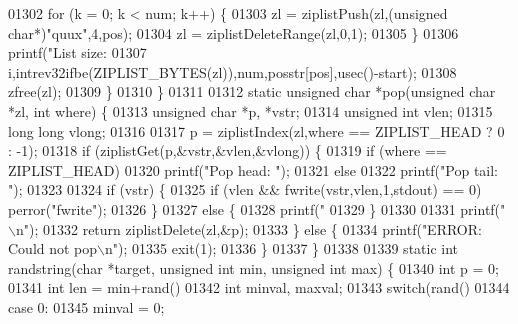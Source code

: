 \begin{DoxyCode}
{{{{{{{{{{{{{{{01302         \textcolor{keywordflow}{for} (k = 0; k < num; k++) \{
01303             zl = ziplistPush(zl,(\textcolor{keywordtype}{unsigned} \textcolor{keywordtype}{char}*)\textcolor{stringliteral}{"quux"},4,pos);
01304             zl = ziplistDeleteRange(zl,0,1);
01305         \}
01306         printf(\textcolor{stringliteral}{"List size: %
01307             i,intrev32ifbe(ZIPLIST\_BYTES(zl)),num,posstr[pos],usec()-start);
01308         zfree(zl);
01309     \}
01310 \}
01311 
01312 \textcolor{keyword}{static} \textcolor{keywordtype}{unsigned} \textcolor{keywordtype}{char} *pop(\textcolor{keywordtype}{unsigned} \textcolor{keywordtype}{char} *zl, \textcolor{keywordtype}{int} where) \{
01313     \textcolor{keywordtype}{unsigned} \textcolor{keywordtype}{char} *p, *vstr;
01314     \textcolor{keywordtype}{unsigned} \textcolor{keywordtype}{int} vlen;
01315     \textcolor{keywordtype}{long} \textcolor{keywordtype}{long} vlong;
01316 
01317     p = ziplistIndex(zl,where == ZIPLIST\_HEAD ? 0 : -1);
01318     \textcolor{keywordflow}{if} (ziplistGet(p,&vstr,&vlen,&vlong)) \{
01319         \textcolor{keywordflow}{if} (where == ZIPLIST\_HEAD)
01320             printf(\textcolor{stringliteral}{"Pop head: "});
01321         \textcolor{keywordflow}{else}
01322             printf(\textcolor{stringliteral}{"Pop tail: "});
01323 
01324         \textcolor{keywordflow}{if} (vstr) \{
01325             \textcolor{keywordflow}{if} (vlen && fwrite(vstr,vlen,1,stdout) == 0) perror(\textcolor{stringliteral}{"fwrite"});
01326         \}
01327         \textcolor{keywordflow}{else} \{
01328             printf(\textcolor{stringliteral}{"%
01329         \}
01330 
01331         printf(\textcolor{stringliteral}{"\(\backslash\)n"});
01332         \textcolor{keywordflow}{return} ziplistDelete(zl,&p);
01333     \} \textcolor{keywordflow}{else} \{
01334         printf(\textcolor{stringliteral}{"ERROR: Could not pop\(\backslash\)n"});
01335         exit(1);
01336     \}
01337 \}
01338 
01339 \textcolor{keyword}{static} \textcolor{keywordtype}{int} randstring(\textcolor{keywordtype}{char} *target, \textcolor{keywordtype}{unsigned} \textcolor{keywordtype}{int} min, \textcolor{keywordtype}{unsigned} \textcolor{keywordtype}{int} max) \{
01340     \textcolor{keywordtype}{int} p = 0;
01341     \textcolor{keywordtype}{int} len = min+rand()%
01342     \textcolor{keywordtype}{int} minval, maxval;
01343     \textcolor{keywordflow}{switch}(rand() %
01344     \textcolor{keywordflow}{case} 0:
01345         minval = 0;
}}}}}}}}}}}}}}}}}
\end{DoxyCode}
